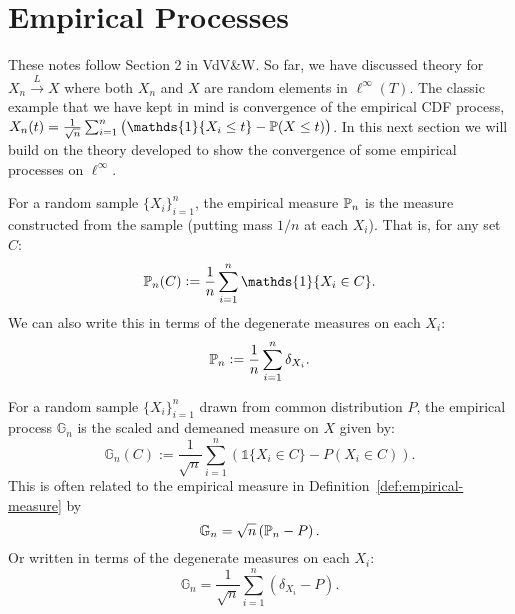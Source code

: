 \section{Empirical Processes}
\label{sec:empirical-processes}

These notes follow Section 2 in VdV\&W. So far, we have discussed theory for \(X_n \overset{L}{\to} X\) where both \(X_n\) and  \(X\) are random elements in  \(\ell^\infty(T)\). The classic example that we have kept in mind is convergence of the empirical CDF process, \(X_n(t) = \frac{1}{\sqrt{n}}\sum_{i=1}^n \left(\mathds{1}\{X_i \leq t\} - \P(X\leq t)\right)\). In this next section we will build on the theory developed to show the convergence of some empirical processes on \(\ell^\infty\).

\begin{definition}
	\label{def:empirical-measure}
	For a random sample \(\{X_i\}_{i=1}^n\), the empirical measure \(\P_n\) is the measure constructed from the sample (putting mass \(1/n\) at each  \(X_i\)). That is, for any set \(C\):
	 \[
		 \P_n(C) := \frac{1}{n}\sum_{i=1}^n \mathds{1}\{X_i \in C\}  
	.\]
	We can also write this in terms of the degenerate measures on each \(X_i\):
	 \[
		 \P_n := \frac{1}{n}\sum_{i=1}^n \delta_{X_i} 
	.\] 
\end{definition}

\begin{definition}
	\label{def:empirical-process}
	For a random sample \(\{X_i\}_{i=1}^n\) drawn from common distribution \(P\), the empirical process \(\mathbb{G}_n\) is the scaled and demeaned measure on \(X\) given by:
	\[\mathbb{G}_n(C) := \frac{1}{\sqrt{n}}\sum_{i=1}^n \left(\mathds{1}\{X_i \in C\} - P(X_i \in C)\right).\]
	This is often related to the empirical measure in Definition~\ref{def:empirical-measure} by
	\[
		\mathbb{G}_n = \sqrt{n}\left(\P_n - P\right)
	.\]
	Or written in terms of the degenerate measures on each \(X_i\):
	 \[
		 \mathbb{G}_n = \frac{1}{\sqrt{n}}\sum_{i=1}^n \left(\delta_{X_i}-P\right) 
	.\] 
\end{definition}

